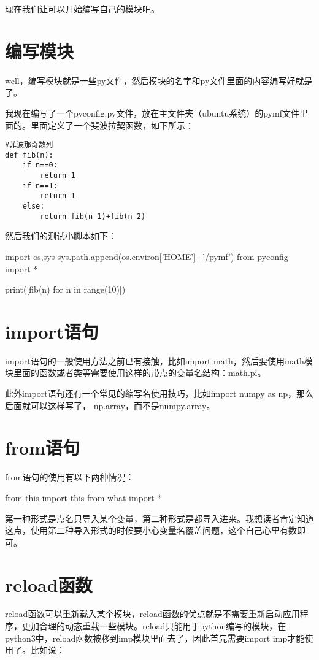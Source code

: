 \documentclass[12pt,oneside]{book}
\begin{document}
\begin{common-format}
现在我们让可以开始编写自己的模块吧。

\section{编写模块}
well，编写模块就是一些py文件，然后模块的名字和py文件里面的内容编写好就是了。

我现在编写了一个pyconfig.py文件，放在主文件夹（ubuntu系统）的pymf文件里面的。里面定义了一个斐波拉契函数，如下所示：
\begin{Verbatim}
#菲波那奇数列
def fib(n):
    if n==0:
        return 1
    if n==1:
        return 1
    else:
        return fib(n-1)+fib(n-2)
\end{Verbatim}

然后我们的测试小脚本如下：

\begin{tcbpython}[]
import os,sys
sys.path.append(os.environ['HOME']+'/pymf')
from pyconfig import *

print([fib(n) for n in range(10)])
\end{tcbpython}



\section{import语句}
import语句的一般使用方法之前已有接触，比如import math，然后要使用math模块里面的函数或者类等需要使用这样的带点的变量名结构：math.pi。

此外import语句还有一个常见的缩写名使用技巧，比如import numpy as np，那么后面就可以这样写了， np.array，而不是numpy.array。


\section{from语句}
from语句的使用有以下两种情况：

\begin{tcbpython}[]
from this import this
from what import *
\end{tcbpython}

第一种形式是点名只导入某个变量，第二种形式是都导入进来。我想读者肯定知道这点，使用第二种导入形式的时候要小心变量名覆盖问题，这个自己心里有数即可。



\section{reload函数}
reload函数可以重新载入某个模块，reload函数的优点就是不需要重新启动应用程序，更加合理的动态重载一些模块。reload只能用于python编写的模块，在python3中，reload函数被移到imp模块里面去了，因此首先需要import imp才能使用了。比如说：


\end{common-format}
\end{document}
